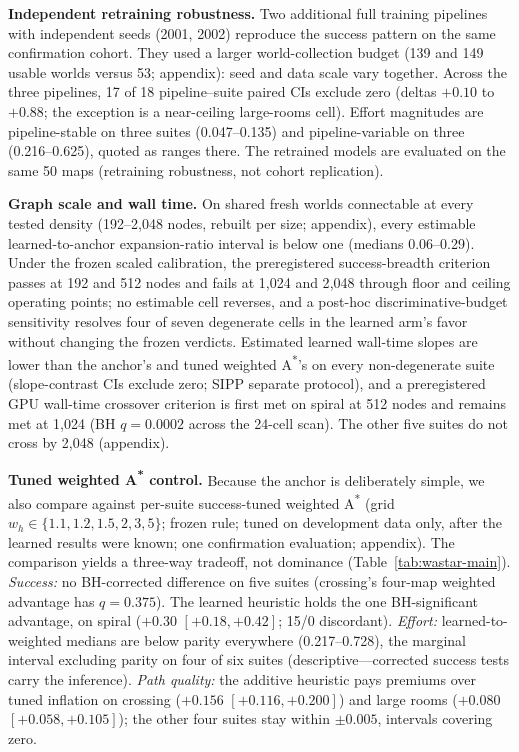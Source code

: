 \documentclass[letterpaper]{article} %
\begin{document}
\textbf{Independent retraining robustness.} Two additional full training pipelines with independent seeds (2001, 2002) reproduce the success pattern on the same confirmation cohort. They used a larger world-collection budget (139 and 149 usable worlds versus 53; appendix): seed and data scale vary together. Across the three pipelines, 17 of 18 pipeline--suite paired CIs exclude zero (deltas $+0.10$ to $+0.88$; the exception is a near-ceiling large-rooms cell). Effort magnitudes are pipeline-stable on three suites (0.047--0.135) and pipeline-variable on three (0.216--0.625), quoted as ranges there. The retrained models are evaluated on the same 50 maps (retraining robustness, not cohort replication).

\textbf{Graph scale and wall time.} On shared fresh worlds connectable at every tested density (192--2{,}048 nodes, rebuilt per size; appendix), every estimable learned-to-anchor expansion-ratio interval is below one (medians 0.06--0.29). Under the frozen scaled calibration, the preregistered success-breadth criterion passes at 192 and 512 nodes and fails at 1{,}024 and 2{,}048 through floor and ceiling operating points; no estimable cell reverses, and a post-hoc discriminative-budget sensitivity resolves four of seven degenerate cells in the learned arm's favor without changing the frozen verdicts. Estimated learned wall-time slopes are lower than the anchor's and tuned weighted A\textsuperscript{*}'s on every non-degenerate suite (slope-contrast CIs exclude zero; SIPP separate protocol), and a preregistered GPU wall-time crossover criterion is first met on spiral at 512 nodes and remains met at 1{,}024 (BH $q{=}0.0002$ across the 24-cell scan). The other five suites do not cross by 2{,}048 (appendix).

\textbf{Tuned weighted A\textsuperscript{*} control.} Because the anchor is deliberately simple, we also compare against per-suite success-tuned weighted A\textsuperscript{*} (grid $w_h \in \{1.1, 1.2, 1.5, 2, 3, 5\}$; frozen rule; tuned on development data only, after the learned results were known; one confirmation evaluation; appendix). The comparison yields a three-way tradeoff, not dominance (Table~\ref{tab:wastar-main}). \emph{Success:} no BH-corrected difference on five suites (crossing's four-map weighted advantage has $q{=}0.375$). The learned heuristic holds the one BH-significant advantage, on spiral ($+0.30$ $[+0.18,+0.42]$; 15/0 discordant). \emph{Effort:} learned-to-weighted medians are below parity everywhere (0.217--0.728), the marginal interval excluding parity on four of six suites (descriptive---corrected success tests carry the inference). \emph{Path quality:} the additive heuristic pays premiums over tuned inflation on crossing ($+0.156$ $[+0.116,+0.200]$) and large rooms ($+0.080$ $[+0.058,+0.105]$); the other four suites stay within $\pm 0.005$, intervals covering zero.
\end{document}

